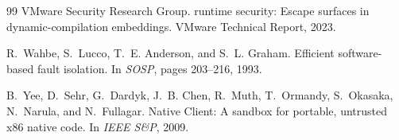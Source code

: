 \documentclass[letterpaper,twocolumn,10pt]{article}
\begin{document}
\begin{thebibliography}{99}
VMware Security Research Group.
 runtime security: Escape surfaces in
  dynamic-compilation embeddings.
\newblock VMware Technical Report, 2023.

R.~Wahbe, S.~Lucco, T.~E. Anderson, and S.~L. Graham.
\newblock Efficient software-based fault isolation.
\newblock In {\em SOSP}, pages 203--216, 1993.

B.~Yee, D.~Sehr, G.~Dardyk, J.~B. Chen, R.~Muth, T.~Ormandy,
S.~Okasaka, N.~Narula, and N.~Fullagar.
\newblock Native {Client}: A sandbox for portable, untrusted x86
  native code.
\newblock In {\em IEEE S\&P}, 2009.

\end{thebibliography}
\fi
\end{document}
